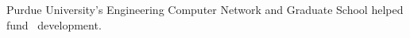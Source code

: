 {
\begin{acknowledgments}
    Purdue University's Engineering Computer Network
    and Graduate School helped fund \PurdueThesisLogo\ development.
\end{acknowledgments}
}